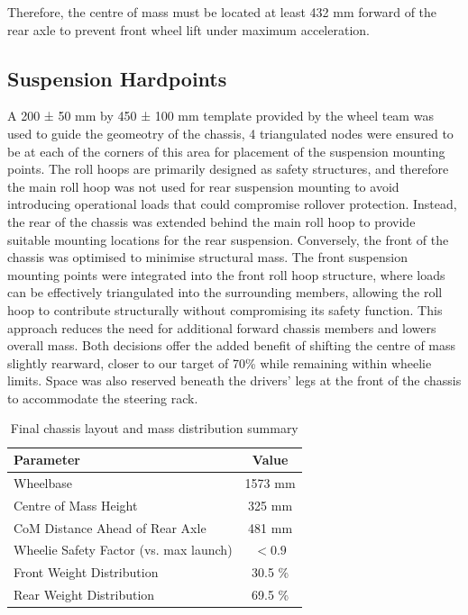Therefore, the centre of mass must be located at least 432 mm forward of the rear axle to prevent front wheel lift under maximum acceleration.

\subsection{Suspension Hardpoints}

A 200 ± 50 mm by 450 ± 100 mm template provided by the wheel team was used to guide the geomeotry of the chassis, 4 triangulated nodes were ensured to be at each of the corners of this area for placement of the suspension mounting points. The roll hoops are primarily designed as safety structures, and therefore the main roll hoop was not used for rear suspension mounting to avoid introducing operational loads that could compromise rollover protection. Instead, the rear of the chassis was extended behind the main roll hoop to provide suitable mounting locations for the rear suspension. Conversely, the front of the chassis was optimised to minimise structural mass. The front suspension mounting points were integrated into the front roll hoop structure, where loads can be effectively triangulated into the surrounding members, allowing the roll hoop to contribute structurally without compromising its safety function. This approach reduces the need for additional forward chassis members and lowers overall mass. Both decisions offer the added benefit of shifting the centre of mass slightly rearward, closer to our target of 70\% while remaining within wheelie limits. Space was also reserved beneath the drivers' legs at the front of the chassis to accommodate the steering rack.

\begin{table}[h]
    \centering
    \caption{Final chassis layout and mass distribution summary}
    \label{tab:layout_summary}
    \begin{tabular}{|l|c|}
        \hline
        \textbf{Parameter} & \textbf{Value} \\
        \hline
        Wheelbase & 1573 mm \\
        Centre of Mass Height & 325 mm \\
        CoM Distance Ahead of Rear Axle & 481 mm \\
        Wheelie Safety Factor (vs. max launch) & $< 0.9$ \\
        Front Weight Distribution & 30.5 \% \\
        Rear Weight Distribution & 69.5 \% \\
        \hline
    \end{tabular}
\end{table}
\vspace{-16pt}

